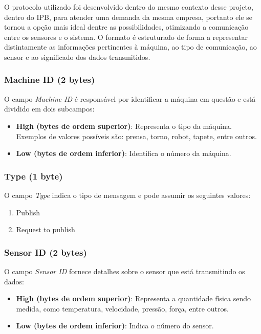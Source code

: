 O protocolo utilizado foi desenvolvido dentro do mesmo contexto desse projeto, dentro do IPB, para atender uma demanda da mesma empresa, portanto ele se tornou a opção mais ideal dentre as possibilidades, otimizando a comunicação entre os sensores e o sistema. O formato é estruturado de forma a representar distintamente as informações pertinentes à máquina, ao tipo de comunicação, ao sensor e ao significado dos dados transmitidos.

\subsubsection{Machine ID (2 bytes)}

O campo \textit{Machine ID} é responsável por identificar a máquina em questão e está dividido em dois subcampos:

\begin{itemize}
    \item \textbf{High (bytes de ordem superior)}: Representa o tipo da máquina. Exemplos de valores possíveis são: prensa, torno, robot, tapete, entre outros.
    \item \textbf{Low (bytes de ordem inferior)}: Identifica o número da máquina.
\end{itemize}

\subsubsection{Type (1 byte)}

O campo \textit{Type} indica o tipo de mensagem e pode assumir os seguintes valores:
\begin{enumerate}
    \item Publish
    \item Request to publish
\end{enumerate}

\subsubsection{Sensor ID (2 bytes)}

O campo \textit{Sensor ID} fornece detalhes sobre o sensor que está transmitindo os dados:

\begin{itemize}
    \item \textbf{High (bytes de ordem superior)}: Representa a quantidade física sendo medida, como temperatura, velocidade, pressão, força, entre outros.
    \item \textbf{Low (bytes de ordem inferior)}: Indica o número do sensor.
\end{itemize}

